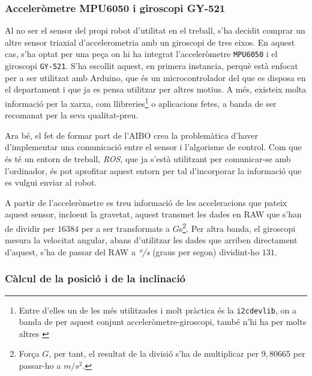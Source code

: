 \documentclass[12pt,a4paper,final,twoside]{article}
\begin{document}
\subsubsection{Acceleròmetre MPU6050 i giroscopi GY-521}

Al no ser el sensor del propi robot d'utilitat en el treball, s'ha decidit comprar un altre sensor triaxial d'accelerometria amb un giroscopi de tres eixos. En aquest cas, s'ha optat per una peça on hi ha integrat l'acceleròmetre \texttt{MPU6050} i el giroscopi \texttt{GY-521}. S'ha escollit aquest, en primera instancia, perquè està enfocat per a ser utilitzat amb Arduino, que és un microcontrolador del que es disposa en el departament i que ja es pensa utilitzar per altres motius. A més, existeix molta informació per la xarxa, com llibreries\footnote{Entre d'elles un de les més utilitzades i molt pràctica és la \texttt{i2cdevlib}, on a banda de per aquest conjunt acceleròmetre-giroscopi, també n'hi ha per molts altres \cite{Rowberg}} o aplicacions fetes, a banda de ser recomanat per la seva qualitat-preu.


Ara bé, el fet de formar part de l'AIBO crea la problemàtica d'haver d'implementar una comunicació entre el sensor i l'algorisme de control. Com que és té un entorn de treball, \textit{ROS}, que ja s'està utilitzant per comunicar-se amb l'ordinador, és pot aprofitar aquest entorn per tal d'incorporar la informació que es vulgui enviar al robot. 

A partir de l'acceleròmetre es treu informació de les acceleracions que pateix aquest sensor, incloent la gravetat, aquest transmet les dades en RAW que s'han de dividir per $16384$ per a ser transformats a $G$s\footnote{Força $G$, per tant, el resultat de la divisió s'ha de multiplicar per $9,80665$ per passar-ho a $m/s^2$.}. Per altra banda, el giroscopi mesura la velocitat angular, abans d'utilitzar les dades que arriben directament d'aquest, s'ha de passar del RAW a \textit{º/s} (graus per segon) dividint-ho $131$.

\subsubsection{Càlcul de la posició i de la inclinació}
\label{Calcul-posicio-inclinacio}
\end{document}
